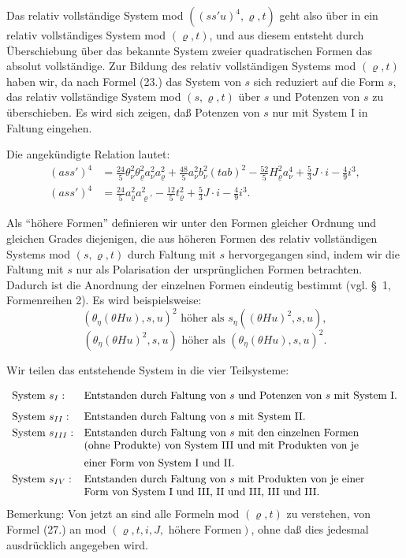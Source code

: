 \documentclass[11pt]{article}
\begin{document}
Das relativ vollständige System mod $((ss'u)^4,\varrho,t)$ geht also über in ein relativ vollständiges System mod $(\varrho,t)$, und aus diesem entsteht durch Überschiebung über das bekannte System zweier quadratischen Formen das absolut vollständige. Zur Bildung des relativ vollständigen Systems mod $(\varrho,t)$ haben wir, da nach Formel (23.) das System von $s$ sich reduziert auf die Form $s$, das relativ vollständige System mod $(s,\varrho,t)$ über $s$ und Potenzen von $s$ zu überschieben. Es wird sich zeigen, daß Potenzen von $s$ nur mit System I in Faltung eingehen.

Die angekündigte Relation lautet:
\[
\tag{22}
\begin{aligned}
(ass')^4&=\frac{24}{5}\theta_\nu^2\theta_\varrho^2a_\nu^2a_\varrho^2+
\frac{48}{5}a_\nu^2b_\nu^2(tab)^2-
\frac{52}{5}H_\varrho^2a_\nu^4+
\frac53J\cdot i-\frac49i^3,\\
(ass')^4&=\frac{24}{5}a_\varrho^2a_{\varrho'}^2-
\frac{12}{5}t_\varrho^2+\frac53J\cdot i-\frac49i^3.
\end{aligned}
\]

Als ``höhere Formen'' definieren wir unter den Formen gleicher Ordnung und gleichen Grades diejenigen, die aus höheren Formen des relativ vollständigen Systems mod $(s,\varrho,t)$ durch Faltung mit $s$ hervorgegangen sind, indem wir die Faltung mit $s$ nur als Polarisation der ursprünglichen Formen betrachten. Dadurch ist die Anordnung der einzelnen Formen eindeutig bestimmt (vgl. \S\ 1, Formenreihen 2). Es wird beispielsweise:
\[
(\theta_\eta(\theta Hu),s,u)^2\text{ höher als }s_\eta((\theta Hu)^2,s,u),
\]
\[
(\theta_\eta(\theta Hu)^2,s,u)\text{ höher als }(\theta_\eta(\theta Hu),s,u)^2.
\]

Wir teilen das entstehende System in die vier Teilsysteme:
\[
\begin{array}{ll}
\text{System }s_I:&\text{Entstanden durch Faltung von }s\text{ und Potenzen von }s\text{ mit System I.}\vphantom{\dfrac11}\\
\text{System }s_{II}:&\text{Entstanden durch Faltung von }s\text{ mit System II.}\vphantom{\dfrac11}\\
\text{System }s_{III}:&\text{Entstanden durch Faltung von }s\text{ mit den einzelnen Formen}\\
&\text{(ohne Produkte) von System III und mit Produkten von je}\\
&\text{einer Form von System I und II.}\vphantom{\dfrac11}\\
\text{System }s_{IV}:&\text{Entstanden durch Faltung von }s\text{ mit Produkten von je einer}\\
&\text{Form von System I und III, II und III, III und III.}
\end{array}
\]
Bemerkung: Von jetzt an sind alle Formeln mod $(\varrho,t)$ zu verstehen, von Formel (27.) an mod $(\varrho,t,i,J,\text{ höhere Formen})$, ohne daß dies jedesmal ausdrücklich angegeben wird.
\end{document}
